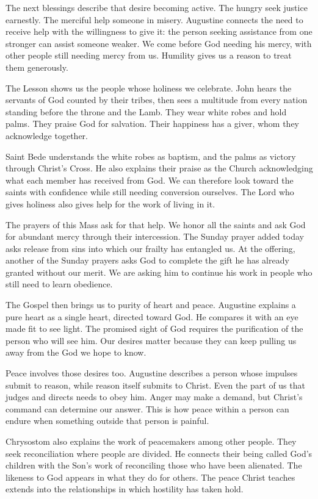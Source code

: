 The next blessings describe that desire becoming active. The hungry
seek justice earnestly. The merciful help someone in misery.
Augustine connects the need to receive help with the willingness
to give it: the person seeking assistance from one stronger can
assist someone weaker. We come before God needing his mercy, with
other people still needing mercy from us. Humility gives us a
reason to treat them generously.

The Lesson shows us the people whose holiness we celebrate.
John hears the servants of God counted by their tribes, then sees
a multitude from every nation standing before the throne and the
Lamb. They wear white robes and hold palms. They praise God for
salvation. Their happiness has a giver, whom they acknowledge
together.

Saint Bede understands the white robes as baptism, and the palms
as victory through Christ's Cross. He also explains their praise
as the Church acknowledging what each member has received from
God. We can therefore look toward the saints with confidence
while still needing conversion ourselves. The Lord who gives
holiness also gives help for the work of living in it.

The prayers of this Mass ask for that help. We honor all the
saints and ask God for abundant mercy through their intercession.
The Sunday prayer added today asks release from sins into which
our frailty has entangled us. At the offering, another of the
Sunday prayers asks God to complete the gift he has already
granted without our merit. We are asking him to continue his
work in people who still need to learn obedience.

The Gospel then brings us to purity of heart and peace.
Augustine explains a pure heart as a single heart, directed
toward God. He compares it with an eye made fit to see light.
The promised sight of God requires the purification of the
person who will see him. Our desires matter because they can
keep pulling us away from the God we hope to know.

Peace involves those desires too. Augustine describes a person
whose impulses submit to reason, while reason itself submits
to Christ. Even the part of us that judges and directs needs
to obey him. Anger may make a demand, but Christ's command
can determine our answer. This is how peace within a person
can endure when something outside that person is painful.

Chrysostom also explains the work of peacemakers among other
people. They seek reconciliation where people are divided.
He connects their being called God's children with the Son's
work of reconciling those who have been alienated. The likeness
to God appears in what they do for others. The peace Christ
teaches extends into the relationships in which hostility
has taken hold.

